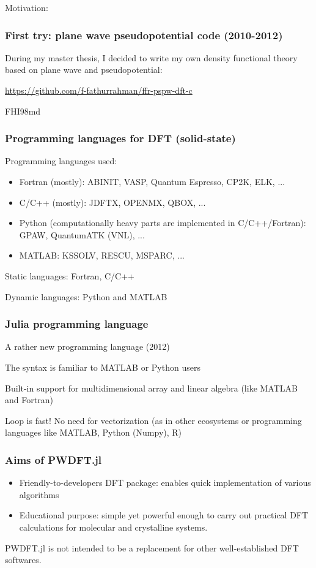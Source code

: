 \begin{frame}

Motivation:

\end{frame}


\begin{frame}
\frametitle{First try: plane wave pseudopotential code (2010-2012)}

During my master thesis, I decided to write my own density functional theory
based on plane wave and pseudopotential:

{\footnotesize\url{https://github.com/f-fathurrahman/ffr-pspw-dft-c}}

FHI98md

\end{frame}


\begin{frame}
\frametitle{Programming languages for DFT (solid-state)}
    
Programming languages used:
\begin{itemize}
\item Fortran (mostly): ABINIT, VASP, Quantum Espresso, CP2K, ELK, ...
\item C/C++ (mostly): JDFTX, OPENMX, QBOX, ...
\item Python (computationally heavy parts are implemented in C/C++/Fortran): GPAW, QuantumATK (VNL), ...
\item MATLAB: KSSOLV, RESCU, MSPARC, ...
\end{itemize}
    
Static languages: Fortran, C/C++

Dynamic languages: Python and MATLAB

\end{frame}



\begin{frame}
\frametitle{Julia programming language}

A rather new programming language (2012)

The syntax is familiar to MATLAB or Python users

Built-in support for multidimensional array and linear algebra
(like MATLAB and Fortran)

Loop is fast! No need for vectorization (as in other ecosystems or
programming languages like MATLAB, Python (Numpy), R)

\end{frame}


\begin{frame}
\frametitle{Aims of PWDFT.jl}

\begin{itemize}
\item Friendly-to-developers DFT package: enables quick implementation of various algorithms
\item Educational purpose: simple yet powerful enough to carry out practical DFT calculations
for molecular and crystalline systems.
\end{itemize}

\textsf{PWDFT.jl} is not intended to be a replacement for other well-established
DFT softwares.

\end{frame}


